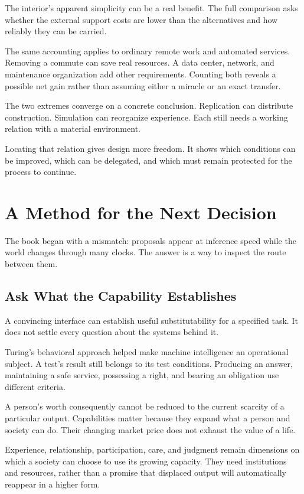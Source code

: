 \documentclass[11pt,openany]{book}
\begin{document}
The interior's apparent simplicity can be a real benefit. The full comparison asks whether the external support costs are lower than the alternatives and how reliably they can be carried.

The same accounting applies to ordinary remote work and automated services. Removing a commute can save real resources. A data center, network, and maintenance organization add other requirements. Counting both reveals a possible net gain rather than assuming either a miracle or an exact transfer.

The two extremes converge on a concrete conclusion. Replication can distribute construction. Simulation can reorganize experience. Each still needs a working relation with a material environment.

Locating that relation gives design more freedom. It shows which conditions can be improved, which can be delegated, and which must remain protected for the process to continue.

\section{A Method for the Next Decision}

The book began with a mismatch: proposals appear at inference speed while the world changes through many clocks. The answer is a way to inspect the route between them.

\subsection{Ask What the Capability Establishes}

A convincing interface can establish useful substitutability for a specified task. It does not settle every question about the systems behind it.

Turing's behavioral approach helped make machine intelligence an operational subject. A test's result still belongs to its test conditions. Producing an answer, maintaining a safe service, possessing a right, and bearing an obligation use different criteria.

A person's worth consequently cannot be reduced to the current scarcity of a particular output. Capabilities matter because they expand what a person and society can do. Their changing market price does not exhaust the value of a life.

Experience, relationship, participation, care, and judgment remain dimensions on which a society can choose to use its growing capacity. They need institutions and resources, rather than a promise that displaced output will automatically reappear in a higher form.
\end{document}
